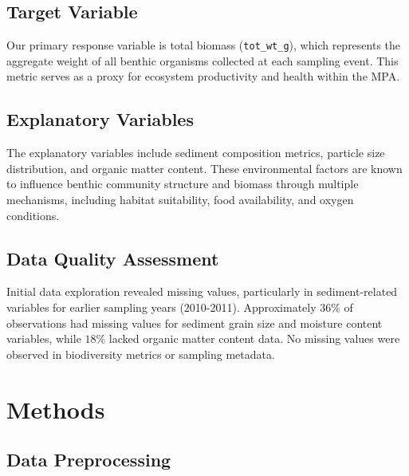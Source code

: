 \documentclass[12pt]{article}
\begin{document}
\subsection{Target Variable}

\qquad Our primary response variable is total biomass (\texttt{tot\_wt\_g}), which represents the aggregate weight of all benthic organisms collected at each sampling event. This metric serves as a proxy for ecosystem productivity and health within the MPA.

\subsection{Explanatory Variables}

\qquad The explanatory variables include sediment composition metrics, particle size distribution, and organic matter content. These environmental factors are known to influence benthic community structure and biomass through multiple mechanisms, including habitat suitability, food availability, and oxygen conditions.

\subsection{Data Quality Assessment}

\qquad Initial data exploration revealed missing values, particularly in sediment-related variables for earlier sampling years (2010-2011). Approximately $36\%$ of observations had missing values for sediment grain size and moisture content variables, while $18\%$ lacked organic matter content data. No missing values were observed in biodiversity metrics or sampling metadata.


\newpage
\section{Methods}

\subsection{Data Preprocessing}
\end{document}
